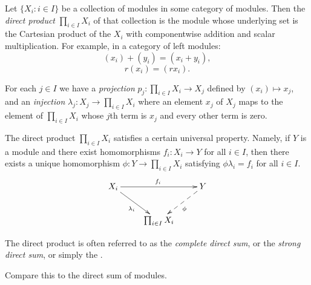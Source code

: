 \documentclass{article}
\begin{document}
Let $\{ X_i : i \in I \}$ be a collection of modules
in some category of modules.
Then the {\it direct product} $\prod_{i \in I} X_i$
of that collection is the module
whose underlying set is the Cartesian product of the $X_i$
with componentwise addition and scalar multiplication.
For example, in a category of left modules:
$$(x_i) + (y_i) = (x_i + y_i),$$
$$r (x_i) = (r x_i).$$

For each $j \in I$ we have
a {\it projection} $p_j : \prod_{i \in I} X_i \to X_j$
defined by $(x_i) \mapsto x_j$,
and
an {\it injection} $\lambda_j : X_j \to \prod_{i \in I} X_i$
where an element $x_j$ of $X_j$
maps to the element of $\prod_{i \in I} X_i$
whose $j$th term is $x_j$ and every other term is zero.

The direct product $\prod_{i \in I} X_i$
satisfies a certain universal property.
Namely, if $Y$ is a module
and there exist homomorphisms $f_i : X_i \to Y$
for all $i \in I$,
then there exists a unique homomorphism
$\phi : Y \to \prod_{i \in I} X_i$
satisfying $\phi \lambda_i = f_i$ for all $i \in I$.
$$
\xymatrix{
  X_i
        \ar[dr]_{\lambda_i}
        \ar[rr]^{f_i}
  &
  &
  Y
        \ar@{-->}[dl]^{\phi}
  \\
  &
  \prod_{i \in I} X_i
}
$$

The direct product is often referred to
as the {\it complete direct sum},
or the {\it strong direct sum},
or simply the {}.

Compare this to the direct sum of modules.
\end{document}

